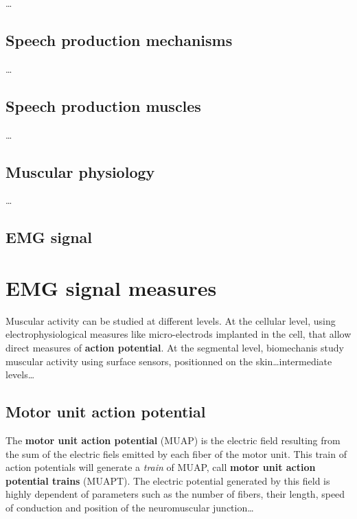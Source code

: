 \documentclass[12pt,]{book}
\theoremstyle{definition}
\theoremstyle{definition}
\theoremstyle{definition}
\theoremstyle{remark}
\begin{document}
\ldots{}

\subsection{Speech production
mechanisms}\label{speech-production-mechanisms}

\ldots{}

\subsection{Speech production muscles}\label{speech-production-muscles}

\ldots{}

\subsection{Muscular physiology}\label{muscular-physiology}

\ldots{}

\subsection{EMG signal}\label{emg-signal}

\section{EMG signal measures}\label{emg-signal-measures}

Muscular activity can be studied at different levels. At the cellular
level, using electrophysiological measures like micro-electrods
implanted in the cell, that allow direct measures of \textbf{action
potential}. At the segmental level, biomechanis study muscular activity
using surface sensors, positionned on the skin\ldots{}intermediate
levels\ldots{}

\subsection{Motor unit action
potential}\label{motor-unit-action-potential}

The \textbf{motor unit action potential} (MUAP) is the electric field
resulting from the sum of the electric fiels emitted by each fiber of
the motor unit. This train of action potentials will generate a
\emph{train} of MUAP, call \textbf{motor unit action potential trains}
(MUAPT). The electric potential generated by this field is highly
dependent of parameters such as the number of fibers, their length,
speed of conduction and position of the neuromuscular junction\ldots{}
\end{document}
